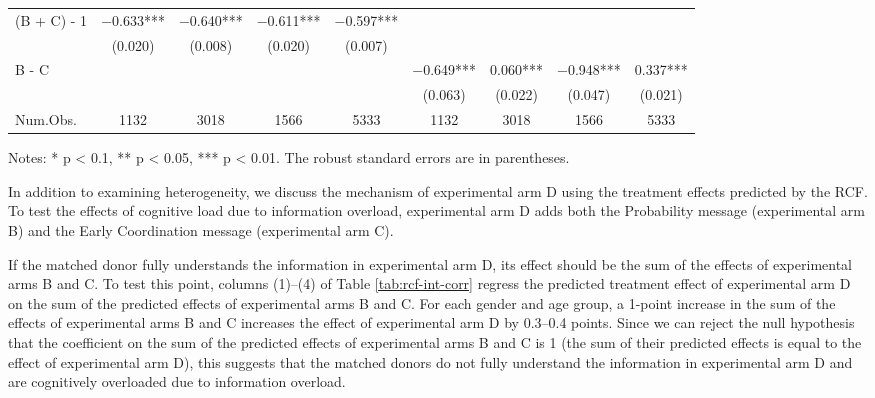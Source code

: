 \documentclass[
]{article}
\begin{document}
\begin{table}
\begin{threeparttable}
\begin{tabular}[t]{lcccccccc}
\hspace{1em}(B + C) - 1 & \num{-0.633}*** & \num{-0.640}*** & \num{-0.611}*** & \num{-0.597}*** &  &  &  & \\
\hspace{1em} & (\num{0.020}) & (\num{0.008}) & (\num{0.020}) & (\num{0.007}) &  &  &  & \\
\hspace{1em}B - C &  &  &  &  & \num{-0.649}*** & \num{0.060}*** & \num{-0.948}*** & \num{0.337}***\\
\hspace{1em} &  &  &  &  & (\num{0.063}) & (\num{0.022}) & (\num{0.047}) & (\num{0.021})\\
\midrule
Num.Obs. & \num{1132} & \num{3018} & \num{1566} & \num{5333} & \num{1132} & \num{3018} & \num{1566} & \num{5333}\\
\bottomrule
\end{tabular}
\begin{tablenotes}
\item Notes: * p < 0.1, ** p < 0.05, *** p < 0.01. The robust standard errors are in parentheses. 
\end{tablenotes}
\end{threeparttable}
\end{table}

In addition to examining heterogeneity, we discuss the mechanism of experimental arm D using the treatment effects predicted by the RCF. To test the effects of cognitive load due to information overload, experimental arm D adds both the Probability message (experimental arm B) and the Early Coordination message (experimental arm C).

If the matched donor fully understands the information in experimental arm D, its effect should be the sum of the effects of experimental arms B and C. To test this point, columns (1)--(4) of Table \ref{tab:rcf-int-corr} regress the predicted treatment effect of experimental arm D on the sum of the predicted effects of experimental arms B and C. For each gender and age group, a 1-point increase in the sum of the effects of experimental arms B and C increases the effect of experimental arm D by 0.3--0.4 points. Since we can reject the null hypothesis that the coefficient on the sum of the predicted effects of experimental arms B and C is 1 (the sum of their predicted effects is equal to the effect of experimental arm D), this suggests that the matched donors do not fully understand the information in experimental arm D and are cognitively overloaded due to information overload.
\end{document}
